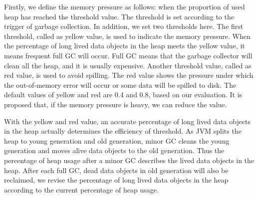 

Firstly, we define the memory pressure as follows: when the proportion of used heap has reached the threshold value. The threshold is set according to the trigger of garbage collection. In addition, we set two thresholds here. The first threshold, called as yellow value, is used to indicate the memory pressure. When the percentage of long lived data objects in the heap meets the yellow value, it means frequent full GC will occur. Full GC means that the garbage collector will clean all the heap, and it is usually expensive. Another threshold value, called as red value, is used to avoid spilling. The red value shows the pressure under which the out-of-memory error will occur or some data will be spilled to disk. The default values of yellow and red are 0.4 and 0.8, based on our evaluation. It is proposed that, if the memory pressure is heavy, we can reduce the value.

With the yellow and red value, an accurate percentage of long lived data objects in the heap actually determines the efficiency of threshold. As JVM splits the heap to young generation and old generation, minor GC cleans the young generation and moves alive data objects to the old generation. Thus the percentage of heap usage after a minor GC describes the lived data objects in the heap. After each full GC, dead data objects in old generation will also be reclaimed, we revise the percentage of long lived data objects in the heap according to the current percentage of heap usage.


